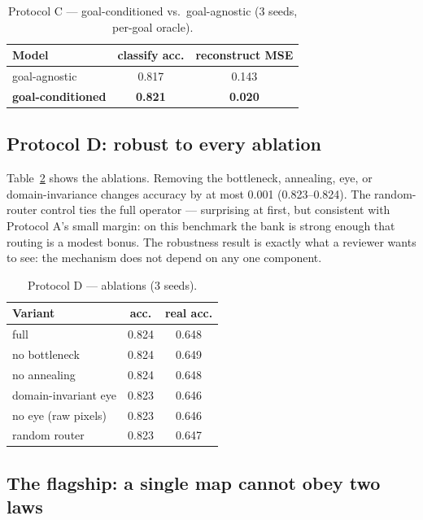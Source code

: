 \documentclass[11pt,a4paper]{article}
\begin{document}
\begin{table}[t]
  \centering
  \caption{Protocol C --- goal-conditioned vs.\ goal-agnostic (3 seeds, per-goal oracle).}
  \label{tab:protC}
  \begin{tabular}{lcc}
    \toprule
    Model & classify acc. & reconstruct MSE \\
    \midrule
    goal-agnostic & 0.817 & 0.143 \\
    \textbf{goal-conditioned} & \textbf{0.821} & \textbf{0.020} \\
    \bottomrule
  \end{tabular}
\end{table}

\subsection{Protocol D: robust to every ablation}
\label{sec:protocolD}

Table~\ref{tab:protD} shows the ablations. Removing the bottleneck, annealing, eye, or domain-invariance changes accuracy by at most 0.001 (0.823--0.824). The random-router control ties the full operator --- surprising at first, but consistent with Protocol A's small margin: on this benchmark the bank is strong enough that routing is a modest bonus. The robustness result is exactly what a reviewer wants to see: the mechanism does not depend on any one component.

\begin{table}[t]
  \centering
  \caption{Protocol D --- ablations (3 seeds).}
  \label{tab:protD}
  \begin{tabular}{lcc}
    \toprule
    Variant & acc. & real acc. \\
    \midrule
    full & 0.824 & 0.648 \\
    no bottleneck & 0.824 & 0.649 \\
    no annealing & 0.824 & 0.648 \\
    domain-invariant eye & 0.823 & 0.646 \\
    no eye (raw pixels) & 0.823 & 0.646 \\
    random router & 0.823 & 0.647 \\
    \bottomrule
  \end{tabular}
\end{table}

\subsection{The flagship: a single map cannot obey two laws}
\label{sec:flagship}
\end{document}
